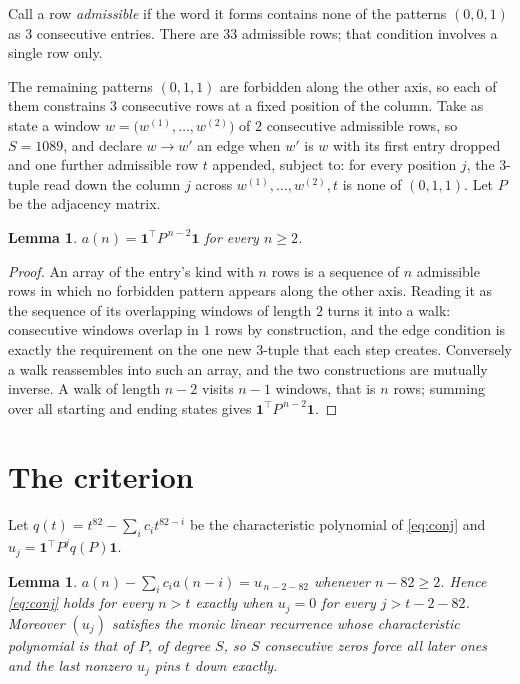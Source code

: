 \documentclass[11pt,a4paper]{article}
\theoremstyle{plain}
\newtheorem{lemma}[theorem]{Lemma}
\theoremstyle{definition}
\begin{document}
Call a row \emph{admissible} if the word it forms contains none of the patterns
$(0,0,1)$ as $3$ consecutive entries. There are $33$ admissible rows; that condition
involves a single row only.

The remaining patterns $(0,1,1)$ are forbidden along the other axis, so each of them
constrains $3$ consecutive rows at a fixed position of the column. Take as state a
window $w=\bigl(w^{(1)},\dots,w^{(2)}\bigr)$ of $2$ consecutive admissible
rows, so $S=1089$, and declare $w\to w'$ an edge when $w'$ is $w$ with its first entry
dropped and one further admissible row $t$ appended, subject to: for every position
$j$, the $3$-tuple read down the column $j$ across $w^{(1)},\dots,w^{(2)},t$
is none of $(0,1,1)$. Let $P$ be the adjacency matrix.

\begin{lemma}\label{lem:walk}
$a(n)=\mathbf{1}^{\!\top}P^{\,n-2}\mathbf{1}$ for every $n\ge2$.
\end{lemma}

\begin{proof}
An array of the entry's kind with $n$ rows is a sequence of $n$ admissible rows in
which no forbidden pattern appears along the other axis. Reading it as the sequence of its
overlapping windows of length $2$ turns it into a walk: consecutive windows overlap in
$1$ rows by construction, and the edge condition is exactly the requirement on the one
new $3$-tuple that each step creates. Conversely a walk reassembles into such an array,
and the two constructions are mutually inverse. A walk of length $n-2$ visits $n-1$
windows, that is $n$ rows; summing over all starting and ending states gives
$\mathbf{1}^{\!\top}P^{\,n-2}\mathbf{1}$.
\end{proof}

\section{The criterion}

Let $q(t)=t^{82}-\sum_i c_i t^{82-i}$ be the characteristic polynomial of
\eqref{eq:conj} and $u_j=\mathbf{1}^{\!\top}P^{j}q(P)\mathbf{1}$.

\begin{lemma}\label{lem:crit}
$a(n)-\sum_i c_i a(n-i)=u_{\,n-2-82}$ whenever $n-82\ge2$. Hence
\eqref{eq:conj} holds for every $n>t$ exactly when $u_j=0$ for every
$j>t-2-82$. Moreover $(u_j)$ satisfies the monic linear recurrence whose
characteristic polynomial is that of $P$, of degree $S$, so $S$ consecutive zeros force all
later ones and the last nonzero $u_j$ pins $t$ down exactly.
\end{lemma}
\end{document}
